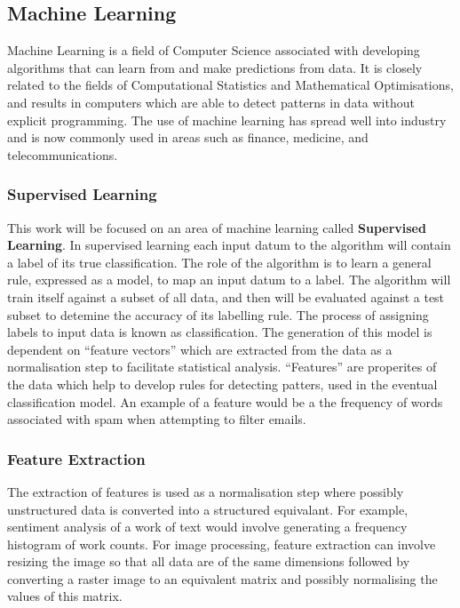 \documentclass[12pt]{article}
\begin{document}
\newpage

\subsection{Machine Learning}
Machine Learning is a field of Computer Science associated with developing algorithms that can learn from and make predictions from data\cite{machineLearningDef}. It is closely related to the fields of Computational Statistics and Mathematical Optimisations, and results in computers which are able to detect patterns in data without explicit programming. The use of machine learning has spread well into industry and is now commonly used in areas such as finance, medicine, and telecommunications.
\newline
\subsubsection{Supervised Learning}
This work will be focused on an area of machine learning called \textbf{Supervised Learning}. In supervised learning each input datum to the algorithm will contain a label of its true classification. The role of the algorithm is to learn a general rule, expressed as a model, to map an input datum to a label. The algorithm will train itself against a subset of all data, and then will be evaluated against a test subset to detemine the accuracy of its labelling rule. The process of assigning labels to input data is known as classification.
\newline
\newline
The generation of this model is dependent on ``feature vectors'' which are extracted from the data as a normalisation step to facilitate statistical analysis. ``Features'' are properites of the data which help to develop rules for detecting patters, used in the eventual classification model. An example of a feature would be a the frequency of words associated with spam when attempting to filter emails.
\newline
\subsubsection{Feature Extraction}
The extraction of features is used as a normalisation step where possibly unstructured data is converted into a structured equivalant. For example, sentiment analysis of a work of text would involve generating a frequency histogram of work counts.
\newline
\newline
For image processing, feature extraction can involve resizing the image so that all data are of the same dimensions followed by converting a raster image to an equivalent matrix and possibly normalising the values of this matrix.
\newline
\end{document}
